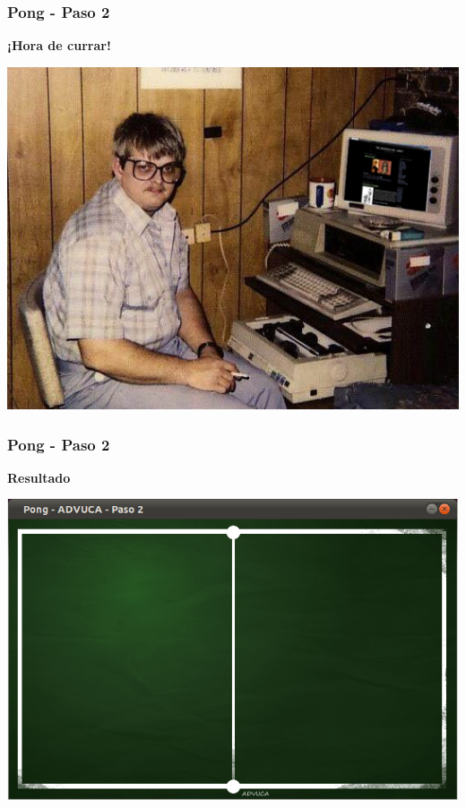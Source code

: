\begin{frame}
	\frametitle{Pong - Paso 2}
	
    \begin{center}
        \textbf{¡Hora de currar!}
    \end{center}
	
    \begin{center}
		\includegraphics[scale=0.4]{img/currar-2.jpg}
	\end{center}	

\end{frame}

\begin{frame}
	\frametitle{Pong - Paso 2}
	
    \begin{center}
        \textbf{Resultado}
    \end{center}
	
    \begin{center}
		\includegraphics[scale=0.4]{img/pong-advuca-2.png}
	\end{center}	

\end{frame}

